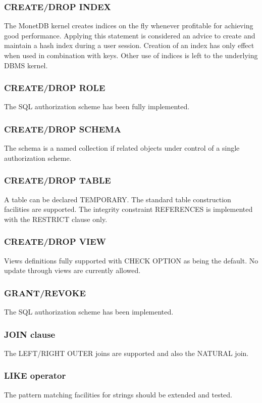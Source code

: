 \documentclass[10pt,twocolumn,fleqn]{article}
\begin{document}
\subsubsection*{CREATE/DROP INDEX}

The MonetDB kernel creates indices on the fly whenever profitable for
achieving good performance. Applying this statement is considered
an advice to create and maintain a hash index during a user session.
Creation of an index has only effect when used in combination
with keys. Other use of indices is left to the underlying DBMS kernel.

\subsubsection*{CREATE/DROP ROLE}
The SQL authorization scheme has been fully implemented.

\subsubsection*{CREATE/DROP SCHEMA}
The schema is a named collection if related objects under control of
a single authorization scheme. 

\subsubsection*{CREATE/DROP TABLE}
A table can be declared TEMPORARY. The standard table construction
facilities are supported. The integrity constraint REFERENCES is implemented
with the RESTRICT clause only.

\subsubsection*{CREATE/DROP VIEW}
Views definitions fully supported with CHECK OPTION as being the default.
No update through views are currently allowed.

\subsubsection*{GRANT/REVOKE}
The SQL authorization scheme has been implemented.

\subsubsection*{JOIN clause}
The LEFT/RIGHT OUTER joins are supported and also the NATURAL join.

\subsubsection*{LIKE operator}
The pattern matching facilities for strings should be extended and tested.
\end{document}
